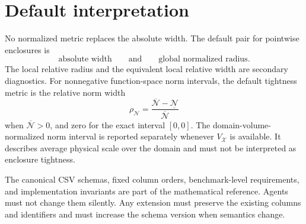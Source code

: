 \documentclass[11pt]{article}
\begin{document}
\section{Default interpretation}

No normalized metric replaces the absolute width.  The default pair for
pointwise enclosures is
\[
 \boxed{\text{absolute width}}
 \qquad\text{and}\qquad
 \boxed{\text{global normalized radius}}.
\]
The local relative radius and the equivalent local relative width are secondary
diagnostics.  For nonnegative function-space norm intervals, the default
tightness metric is the relative norm width
\[
 \rho_{\mathcal N}
 =\frac{\overline{\mathcal N}-\underline{\mathcal N}}
 {\overline{\mathcal N}}
\]
when \(\overline{\mathcal N}>0\), and zero for the exact interval \([0,0]\).
The domain-volume-normalized norm interval is reported separately whenever
\(V_{\mathcal X}\) is available.  It describes average physical scale over
the domain and must not be interpreted as enclosure tightness.

The canonical CSV schemas, fixed column orders, benchmark-level requirements,
and implementation invariants are part of the mathematical reference.  Agents
must not change them silently.  Any extension must preserve the existing
columns and identifiers and must increase the schema version when semantics
change.
\end{document}
